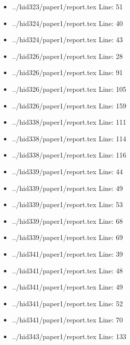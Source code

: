 \begin{itemize}
\item
  ../hid323/paper1/report.tex Line: 51
\item
  ../hid324/paper1/report.tex Line: 40
\item
  ../hid324/paper1/report.tex Line: 43
\item
  ../hid326/paper1/report.tex Line: 28
\item
  ../hid326/paper1/report.tex Line: 91
\item
  ../hid326/paper1/report.tex Line: 105
\item
  ../hid326/paper1/report.tex Line: 159
\item
  ../hid338/paper1/report.tex Line: 111
\item
  ../hid338/paper1/report.tex Line: 114
\item
  ../hid338/paper1/report.tex Line: 116
\item
  ../hid339/paper1/report.tex Line: 44
\item
  ../hid339/paper1/report.tex Line: 49
\item
  ../hid339/paper1/report.tex Line: 53
\item
  ../hid339/paper1/report.tex Line: 68
\item
  ../hid339/paper1/report.tex Line: 69
\item
  ../hid341/paper1/report.tex Line: 39
\item
  ../hid341/paper1/report.tex Line: 48
\item
  ../hid341/paper1/report.tex Line: 49
\item
  ../hid341/paper1/report.tex Line: 52
\item
  ../hid341/paper1/report.tex Line: 70
\item
  ../hid343/paper1/report.tex Line: 133
\end{itemize}
